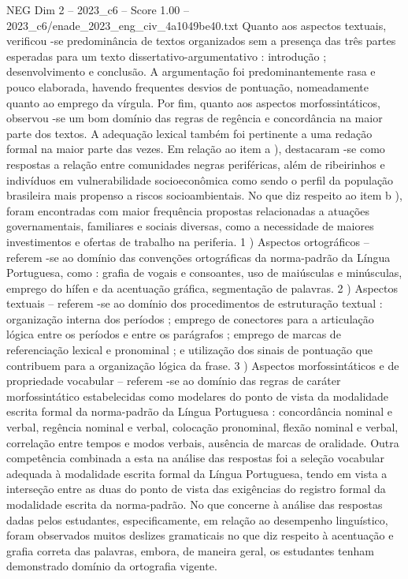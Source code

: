 \begin{textsample}{NEG Dim 2 – 2023\_c6 – Score 1.00 – 2023\_c6/enade\_2023\_eng\_civ\_4a1049be40.txt}
Quanto aos aspectos textuais, verificou -se predominância de textos organizados sem a presença das três partes esperadas para um texto dissertativo-argumentativo : introdução ; desenvolvimento e conclusão.
A argumentação foi predominantemente rasa e pouco elaborada, havendo frequentes desvios de pontuação, nomeadamente quanto ao emprego da vírgula.
Por fim, quanto aos aspectos morfossintáticos, observou -se um bom domínio das regras de regência e concordância na maior parte dos textos.
A adequação lexical também foi pertinente a uma redação formal na maior parte das vezes.
Em relação ao item a ), destacaram -se como respostas a relação entre comunidades negras periféricas, além de ribeirinhos e indivíduos em vulnerabilidade socioeconômica como sendo o perfil da população brasileira mais propenso a riscos socioambientais.
No que diz respeito ao item b ), foram encontradas com maior frequência propostas relacionadas a atuações governamentais, familiares e sociais diversas, como a necessidade de maiores investimentos e ofertas de trabalho na periferia. 1 ) Aspectos ortográficos – referem -se ao domínio das convenções ortográficas da norma-padrão da Língua Portuguesa, como : grafia de vogais e consoantes, uso de maiúsculas e minúsculas, emprego do hífen e da acentuação gráfica, segmentação de palavras. 2 ) Aspectos textuais – referem -se ao domínio dos procedimentos de estruturação textual : organização interna dos períodos ; emprego de conectores para a articulação lógica entre os períodos e entre os parágrafos ; emprego de marcas de referenciação lexical e pronominal ; e utilização dos sinais de pontuação que contribuem para a organização lógica da frase. 3 ) Aspectos morfossintáticos e de propriedade vocabular – referem -se ao domínio das regras de caráter morfossintático estabelecidas como modelares do ponto de vista da modalidade escrita formal da norma-padrão da Língua Portuguesa : concordância nominal e verbal, regência nominal e verbal, colocação pronominal, flexão nominal e verbal, correlação entre tempos e modos verbais, ausência de marcas de oralidade.
Outra competência combinada a esta na análise das respostas foi a seleção vocabular adequada à modalidade escrita formal da Língua Portuguesa, tendo em vista a interseção entre as duas do ponto de vista das exigências do registro formal da modalidade escrita da norma-padrão.
No que concerne à análise das respostas dadas pelos estudantes, especificamente, em relação ao desempenho linguístico, foram observados muitos deslizes gramaticais no que diz respeito à acentuação e grafia correta das palavras, embora, de maneira geral, os estudantes tenham demonstrado domínio da ortografia vigente.

\end{textsample}
